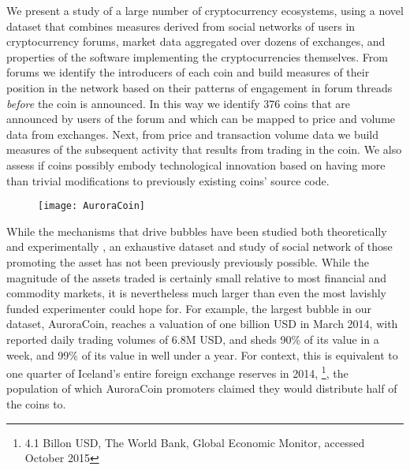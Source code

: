 
We present a study of a large number of cryptocurrency ecosystems, 
using a novel dataset that combines measures derived from social networks of users in cryptocurrency forums, market data aggregated over dozens of exchanges, and properties of the software implementing the cryptocurrencies themselves.
From forums we identify the introducers of each coin and build measures of their position in the network based on
their patterns of engagement in forum threads
\emph{before} the coin is announced.
In this way we identify 376 coins that are announced by users of the forum and which can be mapped to price and volume data from exchanges.
Next, from price and transaction volume data we build measures of the subsequent activity that results from trading in the coin. 
We also assess if coins possibly embody technological innovation based on having more than trivial modifications to previously existing coins' source code.


\begin{figure}
\texttt{[image: AuroraCoin]}
\end{figure}

While the mechanisms that drive bubbles have been studied both theoretically 
\cite{abolafia1988enacting, earl2007decision, bakker2010social, harras2011grow}
and experimentally
\cite{moinas2013bubble},
an exhaustive dataset and study of social network of those promoting the asset has not been previously previously possible.
While the magnitude of the assets traded is certainly small relative to most financial and commodity markets, it is nevertheless much larger than
even the most lavishly funded experimenter could hope for.
For example, the largest bubble in our dataset, AuroraCoin, reaches a valuation of one billion USD in March 2014,
with reported daily trading volumes of 6.8M USD, and sheds 90\% of its value in a week, and 99\% of its value in well under a year.
For context, this is equivalent to one quarter of Iceland's entire foreign exchange reserves in 2014, \footnote{4.1 Billon USD, The World Bank, Global Economic Monitor, accessed October 2015}, the population of which AuroraCoin promoters claimed they would distribute half of the coins to.


